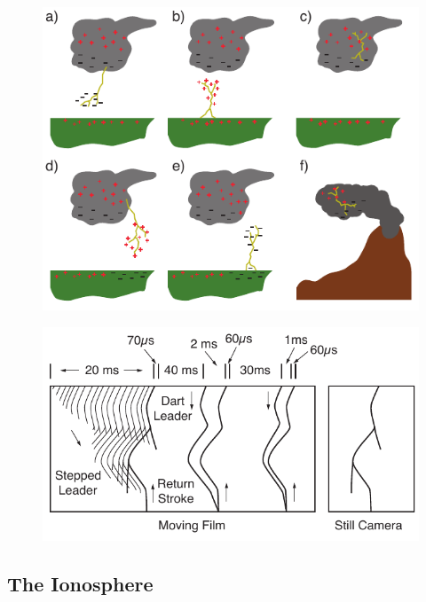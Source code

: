 \begin{figure}[ht!]
	\centering
	\includegraphics[scale=1]{Introduction/Figures/Lightning_Types.pdf}\\
	\caption{}
	\label{intro:fig:thunderstorm}
\end{figure}

\begin{figure}[ht!]
	\centering
	\includegraphics[scale=1]{Introduction/Figures/Lightning_Evolution.pdf}\\
	\caption{}
	\label{intro:fig:evolution}
\end{figure}


\subsection{The Ionosphere}

